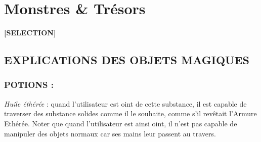 \newpage
{}\section*{Monstres \& Trésors}

\begin{center}
\textbf{[SELECTION]}
\end{center}

\subsection*{EXPLICATIONS DES OBJETS MAGIQUES}

\subsubsection*{POTIONS :}

\label{objet-huile-etheree}\textit{Huile éthérée} : quand l'utilisateur est oint de cette substance, il est capable de traverser des substance solides comme il le souhaite, comme s'il revêtait l'Armure Ethérée. Noter que quand l'utilisateur est ainsi oint, il n'est pas capable de manipuler des objets normaux car ses mains leur passent au travers.
